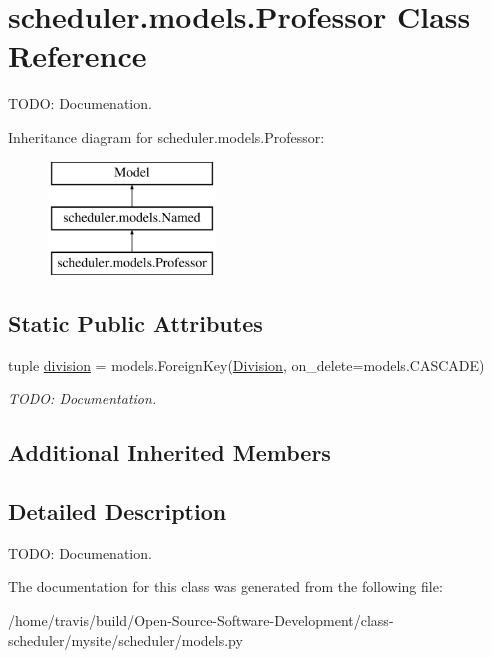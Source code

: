 \hypertarget{classscheduler_1_1models_1_1_professor}{\section{scheduler.\-models.\-Professor Class Reference}
\label{classscheduler_1_1models_1_1_professor}
}


T\-O\-D\-O\-: Documenation.  


Inheritance diagram for scheduler.\-models.\-Professor\-:\begin{figure}[H]
\begin{center}
\leavevmode
\includegraphics[height=3.000000cm]{classscheduler_1_1models_1_1_professor}
\end{center}
\end{figure}
\subsection*{Static Public Attributes}
\begin{DoxyCompactItemize}
\item 
\hypertarget{classscheduler_1_1models_1_1_professor_adf91e6bff4702170c31cb6135f23f31b}{tuple \hyperlink{classscheduler_1_1models_1_1_professor_adf91e6bff4702170c31cb6135f23f31b}{division} = models.\-Foreign\-Key(\hyperlink{classscheduler_1_1models_1_1_division}{Division}, on\-\_\-delete=models.\-C\-A\-S\-C\-A\-D\-E)}\label{classscheduler_1_1models_1_1_professor_adf91e6bff4702170c31cb6135f23f31b}

\begin{DoxyCompactList}\small\item\em T\-O\-D\-O\-: Documentation. \end{DoxyCompactList}\end{DoxyCompactItemize}
\subsection*{Additional Inherited Members}


\subsection{Detailed Description}
T\-O\-D\-O\-: Documenation. 

The documentation for this class was generated from the following file\-:\begin{DoxyCompactItemize}
\item 
/home/travis/build/\-Open-\/\-Source-\/\-Software-\/\-Development/class-\/scheduler/mysite/scheduler/models.\-py\end{DoxyCompactItemize}
